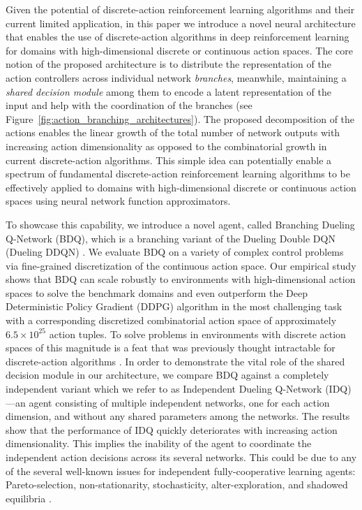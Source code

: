 \documentclass[letterpaper]{article}
\newcommand{\citep}{\cite}
\begin{document}
Given the potential of discrete-action reinforcement learning algorithms and their current limited application, in this paper we introduce a novel neural architecture that enables the use of discrete-action algorithms in deep reinforcement learning for domains with high-dimensional discrete or continuous action spaces. The core notion of the proposed architecture is to distribute the representation of the action controllers across individual network \textit{branches}, meanwhile, maintaining a \textit{shared decision module} among them to encode a latent representation of the input and help with the coordination of the branches (see Figure~\ref{fig:action_branching_architectures}). The proposed decomposition of the actions enables the linear growth of the total number of network outputs with increasing action dimensionality as opposed to the combinatorial growth in current discrete-action algorithms. This simple idea can potentially enable a spectrum of fundamental discrete-action reinforcement learning algorithms to be effectively applied to domains with high-dimensional discrete or continuous action spaces using neural network function approximators.

To showcase this capability, we introduce a novel agent, called Branching Dueling Q-Network (BDQ), which is a branching variant of the Dueling Double DQN (Dueling DDQN) \citep{Wang:2016}. We evaluate BDQ on a variety of complex control problems via fine-grained discretization of the continuous action space. Our empirical study shows that BDQ can scale robustly to environments with high-dimensional action spaces to solve the benchmark domains and even outperform the Deep Deterministic Policy Gradient (DDPG) algorithm \citep{Lillicrap:2016ddpg} in the most challenging task with a corresponding discretized combinatorial action space of approximately $6.5 \times 10^{25}$ action tuples. To solve problems in environments with discrete action spaces of this magnitude is a feat that was previously thought intractable for discrete-action algorithms \citep{Lillicrap:2016ddpg,Schulman:2017ppo}. In order to demonstrate the vital role of the shared decision module in our architecture, we compare BDQ against a completely independent variant which we refer to as Independent Dueling Q-Network (IDQ)---an agent consisting of multiple independent networks, one for each action dimension, and without any shared parameters among the networks. The results show that the performance of IDQ quickly deteriorates with increasing action dimensionality. This implies the inability of the agent to coordinate the independent action decisions across its several networks. This could be due to any of the several well-known issues for independent fully-cooperative learning agents: Pareto-selection, non-stationarity, stochasticity, alter-exploration, and shadowed equilibria \citep{Matignon:2012independent}.
\end{document}
